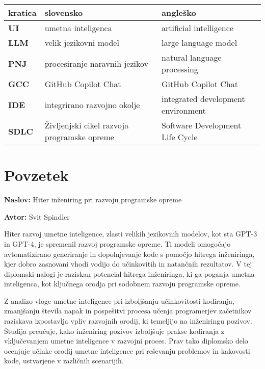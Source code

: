 \documentclass[a4paper,12pt,openright]{book}
\newcommand{\ttitle}{Hiter inženiring pri razvoju programske opreme}
\newcommand{\tauthor}{Svit Spindler}
\newcommand{\clearemptydoublepage}{\newpage{\pagestyle{empty}\cleardoublepage}}
\begin{document}
\noindent\begin{tabular}{p{}|p{}|p{}}    %
  {\bf kratica} & {\bf slovensko}                              & {\bf angleško} \\ \hline
  {\bf UI}      & umetna inteligenca               & artificial intelligence \\
    {\bf LLM}      & velik jezikovni model            & large language model \\
  {\bf PNJ} & procesiranje naravnih jezikov & natural language processing \\
  {\bf GCC}   & GitHub Copilot Chat              & GitHub Copilot Chat \\
    {\bf IDE}   & integrirano razvojno okolje              & integrated development environment \\
      {\bf SDLC}   & Življenjski cikel razvoja programske opreme              & Software Development Life Cycle \\
\end{tabular}


\clearemptydoublepage

{}
\chapter*{Povzetek}

\noindent\textbf{Naslov:} \ttitle
\bigskip

\noindent\textbf{Avtor:} \tauthor
\bigskip

Hiter razvoj umetne inteligence, zlasti velikih jezikovnih modelov, kot sta GPT-3 in GPT-4, je spremenil razvoj programske opreme. Ti modeli omogočajo avtomatizirano generiranje in dopolnjevanje kode s pomočjo hitrega inženiringa, kjer dobro zasnovani vhodi vodijo do učinkovitih in natančnih rezultatov. V tej diplomski nalogi je raziskan potencial hitrega inženiringa, ki ga poganja umetna inteligenca, kot ključnega orodja pri sodobnem razvoju programske opreme.

Z analizo vloge umetne inteligence pri izboljšanju učinkovitosti kodiranja, zmanjšanju števila napak in pospešitvi procesa učenja programerjev začetnikov raziskava izpostavlja vpliv razvojnih orodij, ki temeljijo na inženiringu pozivov. Študija preučuje, kako inženiring pozivov izboljšuje prakse kodiranja z vključevanjem umetne inteligence v razvojni proces. Prav tako diplomsko delo ocenjuje učinke orodij umetne inteligence pri reševanju problemov in kakovosti kode, ustvarjene v različnih scenarijih.
\end{document}
